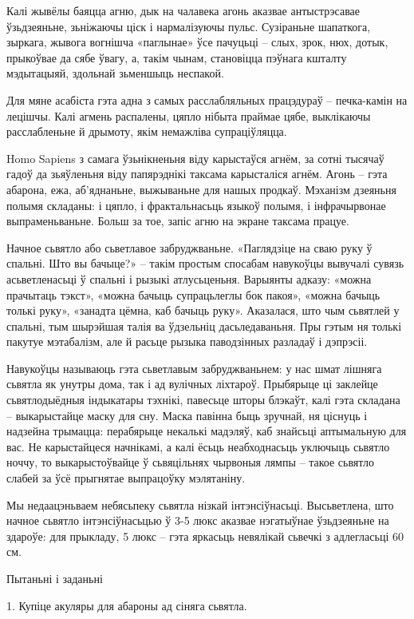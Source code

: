 Калі жывёлы баяцца агню, дык на чалавека агонь аказвае антыстрэсавае ўзьдзеяньне, зьніжаючы ціск і нармалізуючы пульс. Сузіраньне шапаткога, зыркага, жывога вогнішча «паглынае» ўсе пачуцьці – слых, зрок, нюх, дотык, прыкоўвае да сябе ўвагу, а, такім чынам, становіцца пэўнага кшталту мэдытацыяй, здольнай зьменшыць неспакой.

Для мяне асабіста гэта адна з самых расслабляльных працэдураў – печка-камін на лецішчы. Калі агмень распалены, цяпло нібыта праймае цябе, выклікаючы расслабленьне й дрымоту, якім немажліва супраціўляцца.

Homo Sapiens з самага ўзьнікненьня віду карыстаўся агнём, за сотні тысячаў гадоў да зьяўленьня віду папярэднікі таксама карысталіся агнём. Агонь – гэта абарона, ежа, аб'яднаньне, выжываньне для нашых продкаў. Мэханізм дзеяньня полымя складаны: і цяпло, і фрактальнасьць языкоў полымя, і інфрачырвонае выпраменьваньне. Больш за тое, запіс агню на экране таксама працуе.

Начное сьвятло або сьветлавое забруджваньне. «Паглядзіце на сваю руку ў спальні. Што вы бачыце?» – такім простым спосабам навукоўцы вывучалі сувязь асьветленасьці ў спальні і рызыкі атлусьценьня. Варыянты адказу: «можна прачытаць тэкст», «можна бачыць супрацьлеглы бок пакоя», «можна бачыць толькі руку», «занадта цёмна, каб бачыць руку». Аказалася, што чым сьвятлей у спальні, тым шырэйшая талія ва ўдзельніц дасьледаваньня. Пры гэтым ня толькі пакутуе мэтабалізм, але й расьце рызыка паводзінных разладаў і дэпрэсіі.

Навукоўцы называюць гэта сьветлавым забруджваньнем: у нас шмат лішняга сьвятла як унутры дома, так і ад вулічных ліхтароў. Прыбярыце ці заклейце сьвятлодыёдныя індыкатары тэхнікі, павесьце шторы блэкаўт, калі гэта складана – выкарыстайце маску для сну. Маска павінна быць зручнай, ня ціснуць і надзейна трымацца: перабярыце некалькі мадэляў, каб знайсьці аптымальную для вас. Не карыстайцеся начнікамі, а калі ёсьць неабходнасьць уключыць сьвятло ноччу, то выкарыстоўвайце ў сьвяцільнях чырвоныя лямпы – такое сьвятло слабей за ўсё прыгнятае выпрацоўку мэлятаніну.

Мы недаацэньваем небясьпеку сьвятла нізкай інтэнсіўнасьці. Высьветлена, што начное сьвятло інтэнсіўнасьцью ў 3-5 люкс аказвае нэгатыўнае ўзьдзеяньне на здароўе: для прыкладу, 5 люкс – гэта яркасьць невялікай сьвечкі з адлегласьці 60 см.

Пытаньні і заданьні

1. Купіце акуляры для абароны ад сіняга сьвятла.

